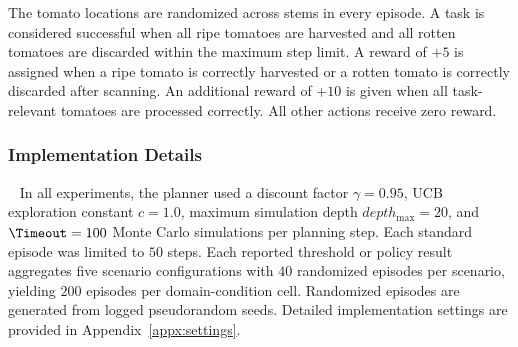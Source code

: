 The tomato locations are randomized across stems in every episode. A task is considered successful when all ripe tomatoes are harvested and all rotten tomatoes are discarded within the maximum step limit. A reward of $+5$ is assigned when a ripe tomato is correctly harvested or a rotten tomato is correctly discarded after scanning. An additional reward of $+10$ is given when all task-relevant tomatoes are processed correctly. All other actions receive zero reward.



\subsubsection{Implementation Details}~\label{exp:details}
In all experiments, the planner used a discount factor $\gamma=0.95$, UCB exploration constant $c=1.0$, maximum simulation depth $depth_{\max}=20$, and $\Timeout=100$ Monte Carlo simulations per planning step. Each standard episode was limited to $50$ steps. Each reported threshold or policy result aggregates five scenario configurations with $40$ randomized episodes per scenario, yielding $200$ episodes per domain-condition cell. Randomized episodes are generated from logged pseudorandom seeds. Detailed implementation settings are provided in Appendix~\ref{appx:settings}.
